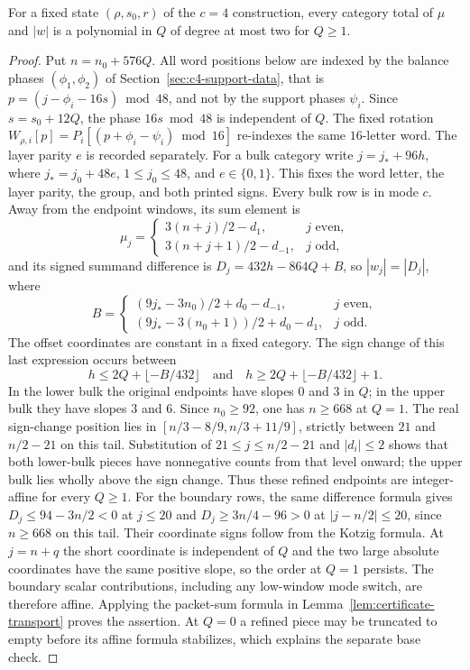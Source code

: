 \begin{lemma}\label{lem:c4-packet-degree}
For a fixed state $(\rho,s_0,r)$ of the $c=4$ construction, every category total of
$\mu$ and $|w|$ is a polynomial in $Q$ of degree at most two for $Q\ge1$.
\end{lemma}
\begin{proof}
Put $n=n_0+576Q$.  All word positions below are indexed by the balance phases
$(\phi_1,\phi_2)$ of Section~\ref{sec:c4-support-data}, that is $p=(j-\phi_i-16s)\bmod48$, and
not by the support phases $\psi_i$. Since $s=s_0+12Q$, the phase $16s\bmod48$ is independent of $Q$.
The fixed rotation $W_{\rho,i}[p]=P_i[(p+\phi_i-\psi_i)\bmod16]$ re-indexes the same
$16$-letter word. The layer parity $e$ is recorded separately. For a bulk category write
$j=j_*+96h$, where $j_*=j_0+48e$, $1\le j_0\le48$, and $e\in\{0,1\}$.
This fixes the word letter, the layer parity, the group, and both printed signs.
Every bulk row is in mode $c$.
Away from the endpoint windows, its sum element is
\[
 \mu_j=\begin{cases}
 3(n+j)/2-d_1,&j\text{ even},\\
 3(n+j+1)/2-d_{-1},&j\text{ odd},
 \end{cases}
\]
and its signed summand difference is $D_j=432h-864Q+B$, so $|w_j|=|D_j|$, where
\[
 B=\begin{cases}
 (9j_*-3n_0)/2+d_0-d_{-1},&j\text{ even},\\
 (9j_*-3(n_0+1))/2+d_0-d_1,&j\text{ odd}.
 \end{cases}
\]
The offset coordinates are constant in a fixed category.  The sign change of this last
expression occurs between
\[
 h\le 2Q+\lfloor-B/432\rfloor
 \quad\text{and}\quad
 h\ge 2Q+\lfloor-B/432\rfloor+1.
\]
In the lower bulk the original endpoints have slopes $0$ and $3$ in $Q$;
in the upper bulk they have slopes $3$ and $6$.  Since $n_0\ge92$,
one has $n\ge668$ at $Q=1$.  The real sign-change position lies in
$[n/3-8/9,n/3+11/9]$, strictly between $21$ and $n/2-21$ on this tail.
Substitution of $21\le j\le n/2-21$ and $|d_i|\le2$ shows that both lower-bulk pieces
have nonnegative counts from that level onward;
the upper bulk lies wholly above the sign change.  Thus these refined endpoints are
integer-affine for every $Q\ge1$. For the boundary rows, the same difference formula gives
$D_j\le94-3n/2<0$ at $j\le20$ and $D_j\ge3n/4-96>0$ at $|j-n/2|\le20$,
since $n\ge668$ on this tail. Their coordinate signs follow from the Kotzig formula.
At $j=n+q$ the short coordinate is independent of $Q$ and the two large absolute
coordinates have the same positive slope, so the order at $Q=1$ persists.
The boundary scalar contributions, including any low-window mode switch, are therefore affine.
Applying the packet-sum formula in Lemma~\ref{lem:certificate-transport} proves the assertion.
At $Q=0$ a refined piece may be truncated to empty before its affine formula stabilizes,
which explains the separate base check.
\end{proof}

